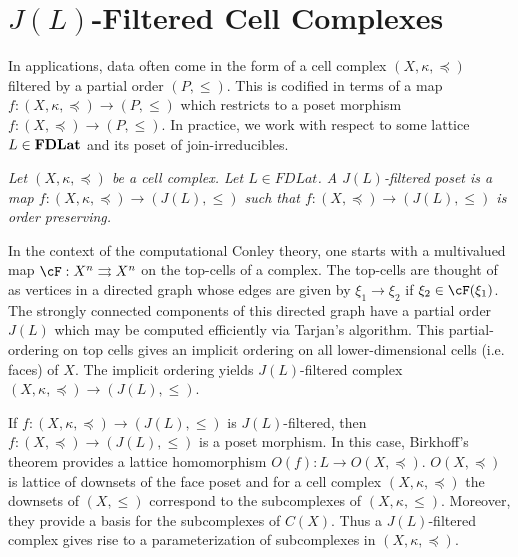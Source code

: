 


\section{$J(L)$-Filtered Cell Complexes}

In applications, data often come in the form of a cell complex $(X,\kappa,\preceq)$ filtered by a partial order $(P,\leq)$.  This is codified in terms of a map $f:(X,\kappa, \preceq)\to (P,\leq)$ which restricts to a poset morphism $f:(X,\preceq)\to (P,\leq)$.  In practice, we work with respect to some lattice $L\in {\bf FDLat}$ and its poset of join-irreducibles.

\begin{defn}
{\em
Let $(X,\kappa,\preceq)$ be a cell complex.  Let $L\in FDLat$.  A {\em $J(L)$-filtered poset} is a map $f:(X,\kappa,\preceq)\to (J(L),\leq)$ such that $f:(X,\preceq)\to (J(L),\leq)$ is order preserving.
}
\end{defn}

In the context of the computational Conley theory, one starts with a multivalued map $\cF: X^n\rightrightarrows X^n$ on the top-cells of a complex.    The top-cells are thought of as vertices in a directed graph whose edges are given by $\xi_1\to \xi_2$ if $\xi_2\in \cF(\xi_1)$.  The strongly connected components of this directed graph have a partial order $J(L)$ which may be computed efficiently via Tarjan's algorithm.   This partial-ordering on top cells gives an implicit ordering on all lower-dimensional cells (i.e. faces) of $X$.  The implicit ordering yields $J(L)$-filtered complex $(X,\kappa,\preceq)\to (J(L),\leq)$.




If $f:(X,\kappa,\preceq)\to (J(L),\leq)$ is $J(L)$-filtered, then $f:(X,\preceq)\to (J(L),\leq)$ is a poset morphism.  In this case, Birkhoff's theorem provides a lattice homomorphism $O(f):L \to O(X,\preceq)$.  $O(X,\preceq)$ is lattice of downsets of the face poset and for a cell complex $(X,\kappa,\preceq)$ the downsets of $(X,\leq)$ correspond to the subcomplexes of $(X,\kappa,\leq)$. Moreover, they provide a basis for the subcomplexes of $C(X)$.   Thus a $J(L)$-filtered complex gives rise to a parameterization of subcomplexes in $(X,\kappa,\preceq)$.




